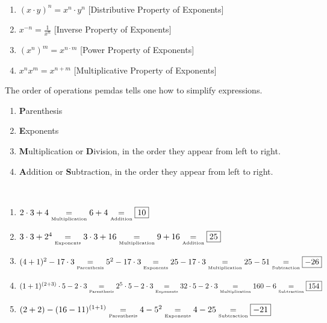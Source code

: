 \documentclass[../main.tex]{subfiles}
\begin{document}
\begin{properties}
\
\label{property:North_Shore_Exponent_Rules}
\begin{enumerate}[itemsep=0pt]
\item \label{property:north_shore_distributive_property_of_expo} $(x\cdot y)^n = x^n \cdot y^n$ \hfill [Distributive Property of Exponents]
\item \label{property:north_shore_inverse_proerty_of_expo} $x^{-n} = \frac{1}{x^n}$ \hfill [Inverse Property of Exponents]
\item \label{property:north_shore_power_property_of_expo} $(x^n)^m = x^{n\cdot m}$ \hfill [Power Property of Exponents]
\item \label{property:north_shore_product_property_of_expo} $x^{n} x^{m} = x^{n+m}$ \hfill [Multiplicative Property of Exponents]
\end{enumerate}
\end{properties}
%
The order of operations \gls{pemdas} tells one how to simplify expressions.
\begin{enumerate}[itemsep=0pt]
\label{North_Shore_PEMDAS}
    \item \textbf{P}arenthesis
    \item \textbf{E}xponents
    \item \textbf{M}ultiplication or \textbf{D}ivision, in the order they appear from left to right.
    \item \textbf{A}ddition or \textbf{S}ubtraction, in the order they appear from left to right.
\end{enumerate}
%
\clearpage
%
\begin{example}
\
\begin{enumerate}[itemsep=0pt]
\item $2\cdot 3 + 4 \underset{\textrm{\tiny Multiplication}}{=} 6+4 \underset{\textrm{\tiny Addition}}{=} \boxed{10}$
\item $3\cdot 3 + 2^4 \underset{\textrm{\tiny Exponents}}{=} 3\cdot 3 + 16 \underset{\textrm{\tiny Multiplication}}{=} 9+16 \underset{\textrm{\tiny Addition}}{=} \boxed{25}$
\item $(4+1)^2 - 17\cdot 3 \underset{\textrm{\tiny Parenthesis}}{=} 5^2 - 17\cdot 3 \underset{\textrm{\tiny Exponents}}{=} 25 - 17 \cdot 3 \underset{\textrm{\tiny Multiplication}}{=} 25 - 51 \underset{\textrm{\tiny Subtraction}}{=} \boxed{-26}$
\item $(1+1)^{(2+3)}\cdot 5 - 2\cdot 3 \underset{\textrm{\tiny Parenthesis}}{=} 2^5\cdot 5 - 2\cdot 3 \underset{\textrm{\tiny Exponents}}{=} 32\cdot 5 - 2\cdot 3 \underset{\textrm{\tiny Multiplication}}{=} 160 - 6\underset{\textrm{\tiny Subtraction}}{=} \boxed{154}$
\item $(2+2) - (16-11)^{(1+1)} \underset{\textrm{\tiny Parenthesis}}{=} 4 - 5^2 \underset{\textrm{\tiny Exponents}}{=} 4 - 25 \underset{\textrm{\tiny Subtraction}}{=} \boxed{-21}$
\end{enumerate}
\end{example}
\end{document}
